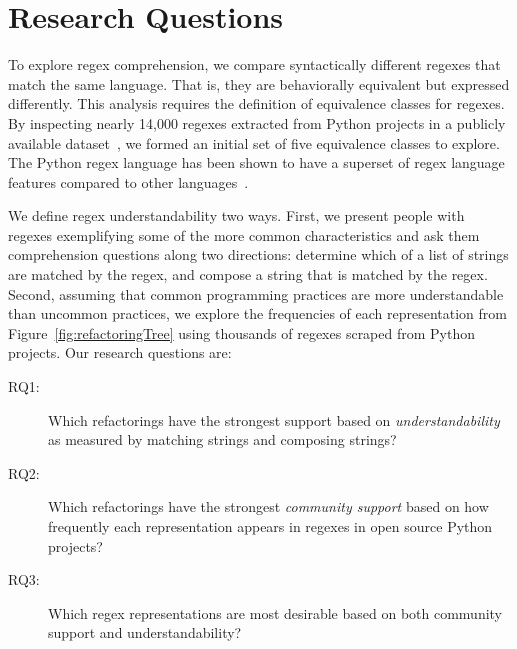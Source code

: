 





\section{Research Questions}
\label{sec:study}

To explore regex comprehension, we compare syntactically different regexes that match the same language. That is, they are behaviorally equivalent but expressed differently. This analysis requires the definition of equivalence classes for regexes. By inspecting  nearly 14,000 regexes extracted from Python projects in a publicly available dataset~\cite{chapmanISSTA}, we formed an initial set of five equivalence classes to explore. The Python regex language has been shown to have a superset of regex language features compared to other languages~\cite{carl's thesis and verify this}.

We define regex understandability two ways. First,  we  present people with regexes exemplifying some of the more common characteristics and ask them comprehension questions along two directions: determine which of a list of strings are matched by the regex, and compose a string that is matched by the regex. Second, assuming that common programming practices are more understandable than uncommon practices, we explore the frequencies of each representation from Figure~\ref{fig:refactoringTree} using thousands of regexes scraped from Python projects. Our  research questions are:

\begin{description}
\item[RQ1:] Which refactorings have the strongest support based on \emph{understandability} as measured by matching strings and composing strings?
\item[RQ2:] Which refactorings have the strongest \emph{community support} based on how frequently each representation appears in regexes in open source Python projects?
\item[RQ3:] Which regex representations are most desirable based on both community support and understandability?
\end{description}

